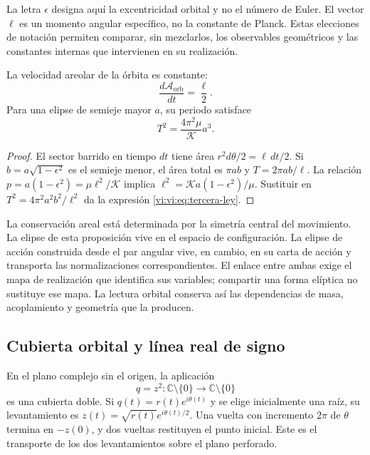 La letra $\epsilon$ designa aquí la excentricidad orbital y
no el número de Euler. El vector $\boldsymbol\ell$ es un
momento angular específico, no la constante de Planck.
Estas elecciones de notación permiten comparar, sin mezclarlos,
los observables geométricos y las constantes internas que
intervienen en su realización.

\begin{proposition}
\label{vi:vi:prop:ley-areal}
La velocidad areolar de la órbita es constante:
\begin{equation}
 \frac{d\mathcal A_{\mathrm{orb}}}{dt}=\frac\ell2.
 \label{vi:vi:eq:ley-areal}
\end{equation}
Para una elipse de semieje mayor $a$, su periodo satisface
\begin{equation}
 T^2=\frac{4\pi^2\mu}{\mathcal K}a^3.
 \label{vi:vi:eq:tercera-ley}
\end{equation}
\end{proposition}
\begin{proof}
El sector barrido en tiempo $dt$ tiene área
$r^2d\theta/2=\ell\,dt/2$. Si $b=a\sqrt{1-\epsilon^2}$
es el semieje menor, el área total es $\pi ab$ y
$T=2\pi ab/\ell$. La relación
$p=a(1-\epsilon^2)=\mu\ell^2/\mathcal K$ implica
$\ell^2=\mathcal K a(1-\epsilon^2)/\mu$.
Sustituir en $T^2=4\pi^2a^2b^2/\ell^2$ da la expresión
\eqref{vi:vi:eq:tercera-ley}.
\end{proof}

La conservación areal está determinada por la simetría central
del movimiento. La elipse de esta proposición vive en el
espacio de configuración. La elipse de acción construida
desde el par angular vive, en cambio, en su carta de acción
y transporta las normalizaciones correspondientes. El enlace
entre ambas exige el mapa de realización que identifica sus
variables; compartir una forma elíptica no sustituye ese mapa.
La lectura orbital conserva así las dependencias de masa,
acoplamiento y geometría que la producen.

\subsection{Cubierta orbital y línea real de signo}
\label{vi:vi:subsec:cubierta-orbital}

En el plano complejo sin el origen, la aplicación
\begin{equation}
 q=z^2:\mathbb C\setminus\{0\}\longrightarrow
                 \mathbb C\setminus\{0\}
 \label{vi:vi:eq:levi-civita}
\end{equation}
es una cubierta doble. Si $q(t)=r(t)e^{i\theta(t)}$ y se
elige inicialmente una raíz, su levantamiento es
$z(t)=\sqrt{r(t)}e^{i\theta(t)/2}$. Una vuelta con incremento
$2\pi$ de $\theta$ termina en $-z(0)$, y dos vueltas
restituyen el punto inicial. Este es el transporte de los dos
levantamientos sobre el plano perforado.

